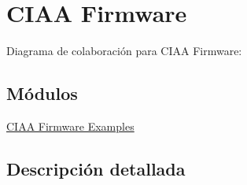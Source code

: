 \hypertarget{group___c_i_a_a___firmware}{}\section{C\+I\+AA Firmware}
\label{group___c_i_a_a___firmware}
Diagrama de colaboración para C\+I\+AA Firmware\+:
\subsection*{Módulos}
\begin{DoxyCompactItemize}
\item 
\hyperlink{group___examples}{C\+I\+A\+A Firmware Examples}
\end{DoxyCompactItemize}


\subsection{Descripción detallada}
